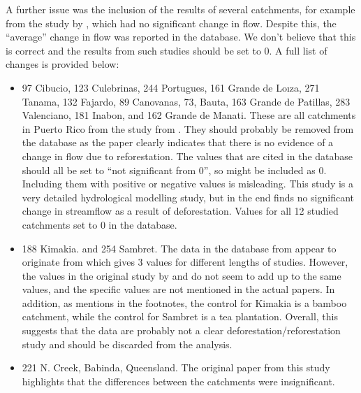 \documentclass[]{elsarticle} %
\providecommand{\tightlist}{%
  \setlength{\itemsep}{0pt}\setlength{\parskip}{0pt}}
\begin{document}
A further issue was the inclusion of the results of several catchments, for example from the study by \citet{beck2013}, which had no significant change in flow. Despite this, the ``average'' change in flow was reported in the database. We don't believe that this is correct and the results from such studies should be set to 0. A full list of changes is provided below:

\begin{itemize}
\tightlist
\item
  97 Cibucio, 123 Culebrinas, 244 Portugues, 161 Grande de Loıza, 271 Tanama, 132 Fajardo, 89 Canovanas, 73, Bauta, 163 Grande de Patillas, 283 Valenciano, 181 Inabon, and 162 Grande de Manati. These are all catchments in Puerto Rico from the study from \citet{beck2013}. They should probably be removed from the database as the paper clearly indicates that there is no evidence of a change in flow due to reforestation. The values that are cited in the database should all be set to ``not significant from 0'', so might be included as 0. Including them with positive or negative values is misleading. This study is a very detailed hydrological modelling study, but in the end finds no significant change in streamflow as a result of deforestation. Values for all 12 studied catchments set to 0 in the database.
\item
  188 Kimakia. and 254 Sambret. The data in the database from \citet{zhang2017} appear to originate from \citet{bruijnzeel1990} which gives 3 values for different lengths of studies. However, the values in the original study by \citet{blackie1979kimakia} and \citet{blackie1979kericho} do not seem to add up to the same values, and the specific values are not mentioned in the actual papers. In addition, as \citet{bruijnzeel1990} mentions in the footnotes, the control for Kimakia is a bamboo catchment, while the control for Sambret is a tea plantation. Overall, this suggests that the data are probably not a clear deforestation/reforestation study and should be discarded from the analysis.
\item
  221 N. Creek, Babinda, Queensland. The original paper from this study highlights that the differences between the catchments were insignificant.
\end{itemize}


\end{document}
